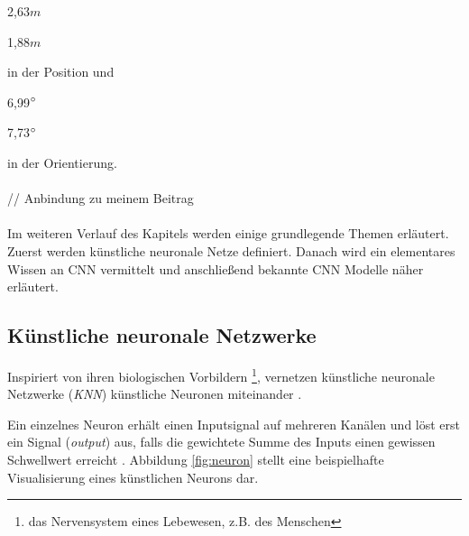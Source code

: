 \begin{enumerate*}[label=\alph*)]
	\addtocounter{enumi}{3}
	\item 2,63$m$
	\item 1,88$m$
\end{enumerate*}
in der Position und  
 \begin{enumerate*}[label=\alph*)]
 	\addtocounter{enumi}{3}
	\item 6,99$\degree$
	\item 7,73$\degree$
\end{enumerate*}
in der Orientierung.
\\\\// Anbindung zu meinem Beitrag
\\\\
Im weiteren Verlauf des Kapitels werden einige grundlegende Themen erläutert. Zuerst werden künstliche neuronale Netze definiert. Danach wird ein elementares Wissen an CNN vermittelt und anschließend bekannte CNN Modelle näher erläutert.


\subsection{Künstliche neuronale Netzwerke}
\label{sec:KNN}
Inspiriert von ihren biologischen Vorbildern \footnote{das Nervensystem eines Lebewesen, z.B. des Menschen}, vernetzen künstliche neuronale Netzwerke (\textit{KNN}) künstliche Neuronen miteinander \cite{CS231nConvolutionalNeural}.

Ein einzelnes Neuron erhält einen Inputsignal auf mehreren Kanälen und löst erst ein Signal (\textit{output}) aus, falls die gewichtete Summe des Inputs einen gewissen Schwellwert erreicht \cite{CS231nConvolutionalNeural}. Abbildung \ref{fig:neuron} stellt eine beispielhafte Visualisierung eines künstlichen Neurons dar.

